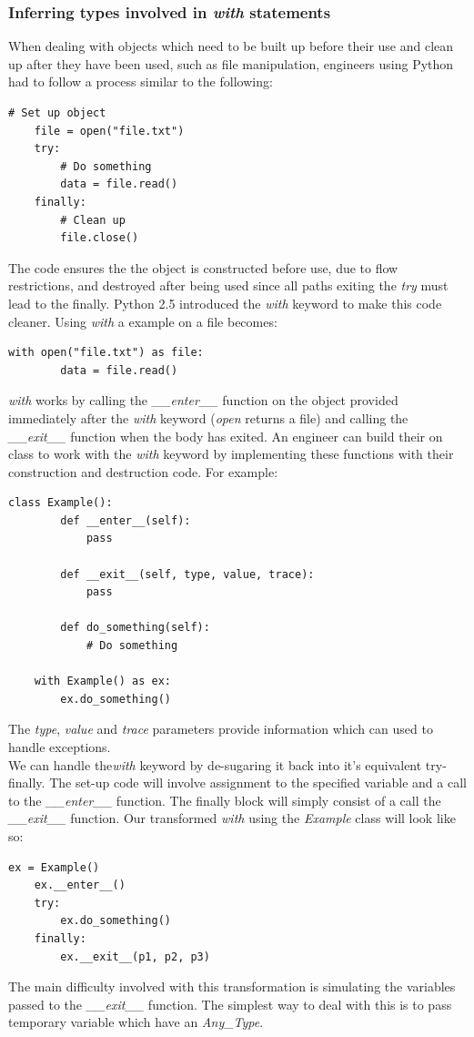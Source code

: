 \documentclass[12pt, titlepage]{article}
\begin{document}
\subsubsection{Inferring types involved in \textit{with} statements}
When dealing with objects which need to be built up before their use and clean up after they have been used, such as file manipulation, engineers using Python had to follow a process similar to the following:
\begin{lstlisting}[mathescape]
	# Set up object
	file = open("file.txt")
	try:
		# Do something
		data = file.read()
	finally:
		# Clean up
		file.close()
\end{lstlisting}
The code ensures the the object is constructed before use, due to flow restrictions, and destroyed after being used since all paths exiting the \textit{try} must lead to the finally. Python 2.5 introduced the \textit{with} keyword to make this code cleaner. Using \textit{with} a example on a file becomes:
\begin{lstlisting}[mathescape]
	with open("file.txt") as file:
		data = file.read()
\end{lstlisting}
\textit{with} works by calling the \textit{\_\_enter\_\_} function on the object provided immediately after the \textit{with} keyword (\textit{open} returns a file) and calling the \textit{\_\_exit\_\_} function when the body has exited. An engineer can build their on class to work with the \textit{with} keyword by implementing these functions with their construction and destruction code. For example:
\begin{lstlisting}[mathescape]
	class Example():
		def __enter__(self):
			pass
			
		def __exit__(self, type, value, trace):
			pass
			
		def do_something(self):
			# Do something
			
	with Example() as ex:
		ex.do_something()
\end{lstlisting}
The \textit{type}, \textit{value} and \textit{trace} parameters provide information which can used to handle exceptions. \\
We can handle the\textit{with} keyword by de-sugaring it back into it's equivalent try-finally. The set-up code will involve assignment to the specified variable and a call to the \textit{\_\_enter\_\_} function. The finally block will simply consist of a call the \textit{\_\_exit\_\_} function. Our transformed \textit{with} using the \textit{Example} class will look like so:
\begin{lstlisting}[mathescape]
	ex = Example()
	ex.__enter__()
	try:
		ex.do_something()
	finally:
		ex.__exit__(p1, p2, p3)
\end{lstlisting}
The main difficulty involved with this transformation is simulating the variables passed to the \textit{\_\_exit\_\_} function. The simplest way to deal with this is to pass temporary variable which have an \textit{Any\_Type}.
{}

\end{document}
